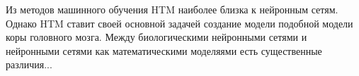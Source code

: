 Из методов машинного обучения HTM наиболее близка к нейронным сетям. Однако HTM ставит своей основной задачей создание модели подобной модели коры головного мозга. Между биологическими нейронными сетями и нейронными сетями как математическими моделяями есть существенные различия...